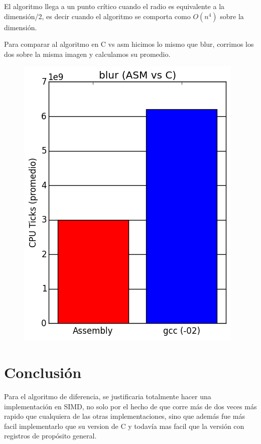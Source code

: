 \documentclass[a4paper]{article}
\begin{document}
El algoritmo llega a un punto crítico cuando el radio es equivalente a la dimensión/2, es decir cuando el algoritmo se comporta como $O(n^4)$ sobre la dimensión.


\newpage 

Para comparar al algoritmo en C vs asm hicimos lo mismo que blur, corrimos los dos sobre la misma imagen y calculamos su promedio.


\begin{figure}[h]
	\centerline{\includegraphics[scale=0.6]{imagenes/test_blur_ASM_C.png}}
\end{figure}

\section{Conclusión}

 Para el algoritmo de diferencia, se justificaria totalmente hacer una implementación en SIMD, no solo por el hecho de que corre más de dos veces más rapido que cualquiera de las otras implementaciones, sino que además fue más facil implementarlo que su version de C y todavía mas facil que la versión con registros de propósito general. 
\end{document}
